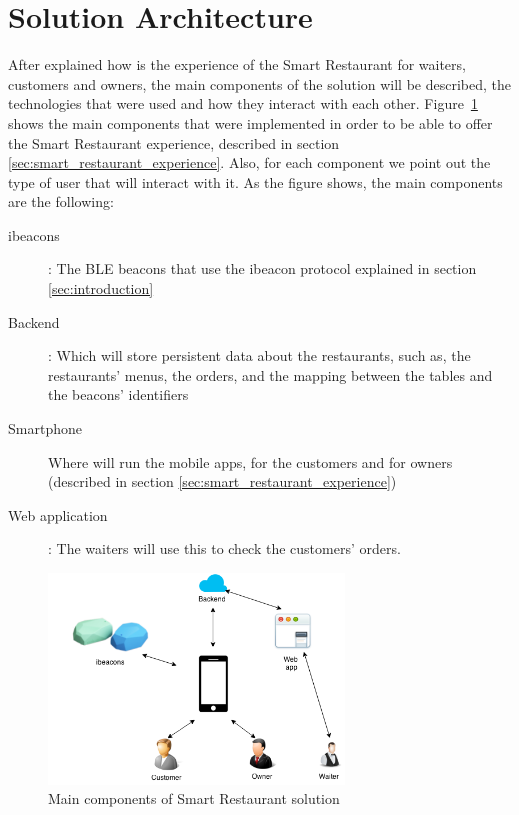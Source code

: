 
\section{Solution Architecture}
\label{sec:solution_architecture}
After explained how is the experience of the Smart Restaurant for waiters,
customers and owners, the main components of the solution will be described,
the technologies that were used and how they interact with each other.
Figure~\ref{fig:architecture_base} shows the main components that were
implemented in order to be able to offer the Smart Restaurant experience,
described in section \ref{sec:smart_restaurant_experience}.
Also, for each component we point out the type of user that will interact
with it.
As the figure shows, the main components are the following:
\begin{description}
  \item[ibeacons]: The BLE beacons that use the ibeacon protocol explained
  in section \ref{sec:introduction}
  \item[Backend]: Which will store persistent data about the restaurants,
  such as, the restaurants' menus, the orders, and the mapping between
  the tables and the beacons' identifiers
  \item[Smartphone] Where will run the mobile apps, for the customers
  and for owners (described in section \ref{sec:smart_restaurant_experience})
  \item[Web application]: The waiters will use this to check the
  customers' orders.
\end{description}

\begin{figure}[!ht]
  \centering
    \includegraphics[width=0.7\textwidth]{figures/architecture_base}
    \caption{Main components of Smart Restaurant solution}
    \label{fig:architecture_base}
\end{figure}

